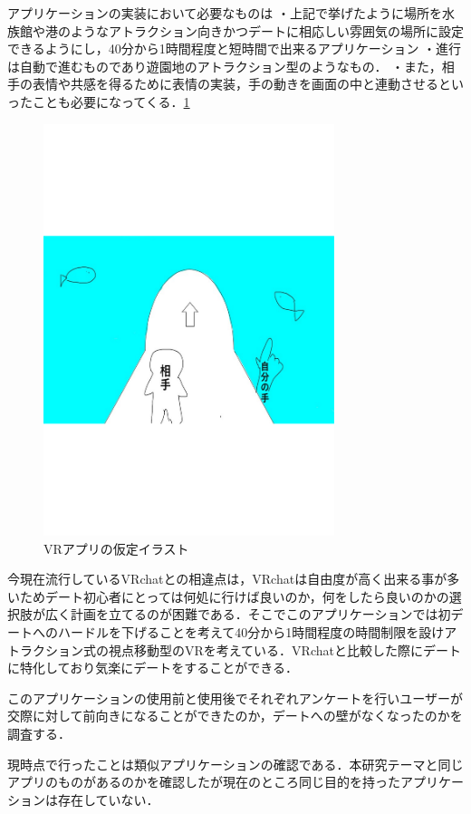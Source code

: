 \documentclass[12pt]{ltjsarticle}
\begin{document}
アプリケーションの実装において必要なものは
・上記で挙げたように場所を水族館や港のようなアトラクション向きかつデートに相応しい雰囲気の場所に設定できるようにし，40分から1時間程度と短時間で出来るアプリケーション
・進行は自動で進むものであり遊園地のアトラクション型のようなもの．
・また，相手の表情や共感を得るために表情の実装，手の動きを画面の中と連動させるといったことも必要になってくる．\ref{fig:イラスト}
\begin{figure}[h]
\begin{center}
 \includegraphics[width=85mm]{fig2.pdf}
\end{center}
 \caption{VRアプリの仮定イラスト}
 \label{fig:イラスト}
\end{figure}

今現在流行しているVRchatとの相違点は，VRchatは自由度が高く出来る事が多いためデート初心者にとっては何処に行けば良いのか，何をしたら良いのかの選択肢が広く計画を立てるのが困難である．そこでこのアプリケーションでは初デートへのハードルを下げることを考えて40分から1時間程度の時間制限を設けアトラクション式の視点移動型のVRを考えている．VRchatと比較した際にデートに特化しており気楽にデートをすることができる．

このアプリケーションの使用前と使用後でそれぞれアンケートを行いユーザーが交際に対して前向きになることができたのか，デートへの壁がなくなったのかを調査する．

現時点で行ったことは類似アプリケーションの確認である．本研究テーマと同じアプリのものがあるのかを確認したが現在のところ同じ目的を持ったアプリケーションは存在していない．
\end{document}
